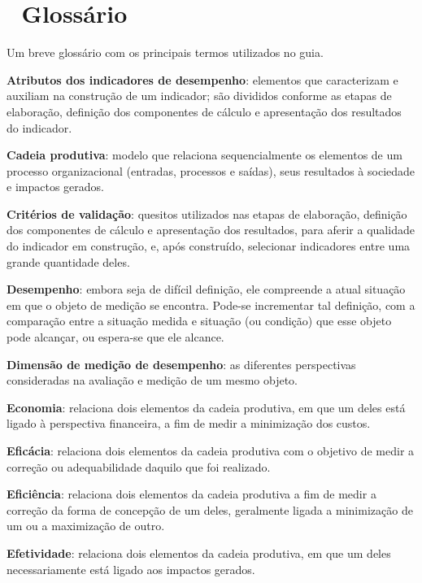 \documentclass[
  letterpaper,
  DIV=11,
  numbers=noendperiod]{scrreprt}
\begin{document}

\hypertarget{glossuxe1rio}{%
\chapter*{📖 Glossário}\label{glossuxe1rio}}


{Um breve glossário com os principais termos utilizados no guia.}

\textbf{Atributos dos indicadores de desempenho}: elementos que
caracterizam e auxiliam na construção de um indicador; são divididos
conforme as etapas de elaboração, definição dos componentes de cálculo e
apresentação dos resultados do indicador.

\textbf{Cadeia produtiva}: modelo que relaciona sequencialmente os
elementos de um processo organizacional (entradas, processos e saídas),
seus resultados à sociedade e impactos gerados.

\textbf{Critérios de validação}: quesitos utilizados nas etapas de
elaboração, definição dos componentes de cálculo e apresentação dos
resultados, para aferir a qualidade do indicador em construção, e, após
construído, selecionar indicadores entre uma grande quantidade deles.

\textbf{Desempenho}: embora seja de difícil definição, ele compreende a
atual situação em que o objeto de medição se encontra. Pode-se
incrementar tal definição, com a comparação entre a situação medida e
situação (ou condição) que esse objeto pode alcançar, ou espera-se que
ele alcance.

\textbf{Dimensão de medição de desempenho}: as diferentes perspectivas
consideradas na avaliação e medição de um mesmo objeto.

\textbf{Economia}: relaciona dois elementos da cadeia produtiva, em que
um deles está ligado à perspectiva financeira, a fim de medir a
minimização dos custos.

\textbf{Eficácia}: relaciona dois elementos da cadeia produtiva com o
objetivo de medir a correção ou adequabilidade daquilo que foi
realizado.

\textbf{Eficiência}: relaciona dois elementos da cadeia produtiva a fim
de medir a correção da forma de concepção de um deles, geralmente ligada
a minimização de um ou a maximização de outro.

\textbf{Efetividade}: relaciona dois elementos da cadeia produtiva, em
que um deles necessariamente está ligado aos impactos gerados.
\end{document}
